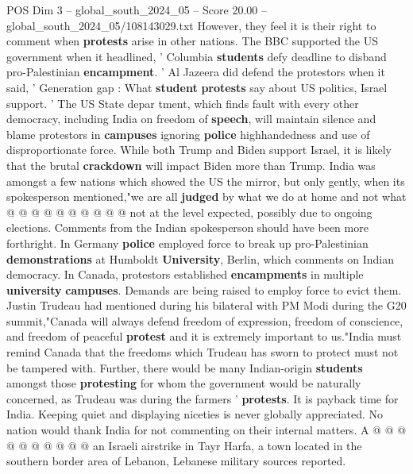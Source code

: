 \begin{textsample}{POS Dim 3 – global\_south\_2024\_05 – Score 20.00 – global\_south\_2024\_05/108143029.txt}
However, they feel it is their right to comment when \textbf{protests} arise in other nations.
The BBC supported the US government when it headlined, ' Columbia \textbf{students} defy deadline to disband pro-Palestinian \textbf{encampment}. ' Al Jazeera did defend the protestors when it said, ' Generation gap : What \textbf{student} \textbf{protests} say about US politics, Israel support. ' The US State depar tment, which finds fault with every other democracy, including India on freedom of \textbf{speech}, will maintain silence and blame protestors in \textbf{campuses} ignoring \textbf{police} highhandedness and use of disproportionate force.
While both Trump and Biden support Israel, it is likely that the brutal \textbf{crackdown} will impact Biden more than Trump.
India was amongst a few nations which showed the US the mirror, but only gently, when its spokesperson mentioned,"we are all \textbf{judged} by what we do at home and not what @ @ @ @ @ @ @ @ @ @ not at the level expected, possibly due to ongoing elections.
Comments from the Indian spokesperson should have been more forthright.
In Germany \textbf{police} employed force to break up pro-Palestinian \textbf{demonstrations} at Humboldt \textbf{University}, Berlin, which comments on Indian democracy.
In Canada, protestors established \textbf{encampments} in multiple \textbf{university} \textbf{campuses}.
Demands are being raised to employ force to evict them.
Justin Trudeau had mentioned during his bilateral with PM Modi during the G20 summit,"Canada will always defend freedom of expression, freedom of conscience, and freedom of peaceful \textbf{protest} and it is extremely important to us."India must remind Canada that the freedoms which Trudeau has sworn to protect must not be tampered with.
Further, there would be many Indian-origin \textbf{students} amongst those \textbf{protesting} for whom the government would be naturally concerned, as Trudeau was during the farmers ' \textbf{protests}.
It is payback time for India.
Keeping quiet and displaying niceties is never globally appreciated.
No nation would thank India for not commenting on their internal matters.
A @ @ @ @ @ @ @ @ @ @ an Israeli airstrike in Tayr Harfa, a town located in the southern border area of Lebanon, Lebanese military sources reported.

\end{textsample}
